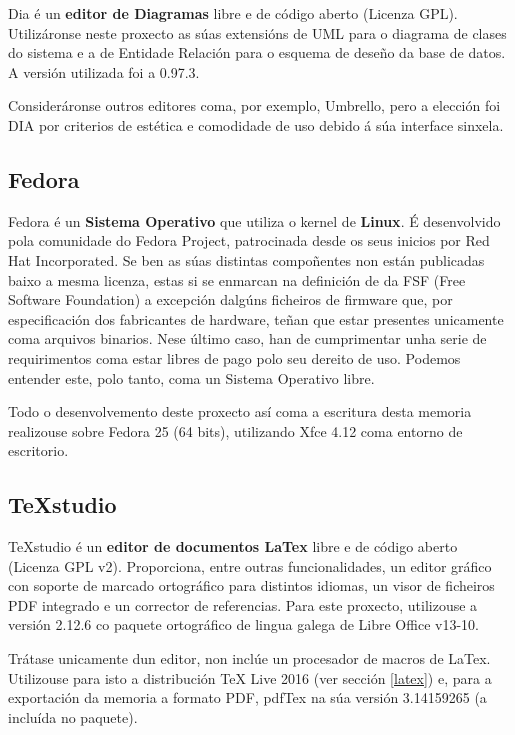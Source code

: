 Dia é un \textbf{editor de Diagramas} libre e de código aberto (Licenza GPL). Utilizáronse neste proxecto as súas extensións de UML para o diagrama de clases do sistema e a de Entidade Relación para o esquema de deseño da base de datos. A versión utilizada foi a 0.97.3.

Consideráronse outros editores coma, por exemplo, Umbrello, pero a elección foi DIA por criterios de estética e comodidade de uso debido á súa interface sinxela.

\subsection{Fedora}

Fedora é un \textbf{Sistema Operativo} que utiliza o kernel de \textbf{Linux}. É desenvolvido pola comunidade do Fedora Project, patrocinada desde os seus inicios por Red Hat Incorporated. Se ben as súas distintas compoñentes non están publicadas baixo a mesma licenza, estas si se enmarcan na definición de  da FSF (Free Software Foundation) a excepción dalgúns ficheiros de firmware que, por especificación dos fabricantes de hardware, teñan que estar presentes unicamente coma arquivos binarios. Nese último caso, han de cumprimentar unha serie de requirimentos coma estar libres de pago polo seu dereito de uso\cite{fedora}. Podemos entender este, polo tanto, coma un Sistema Operativo libre.

Todo o desenvolvemento deste proxecto así coma a escritura desta memoria realizouse sobre Fedora 25 (64 bits), utilizando Xfce 4.12 coma entorno de escritorio.


\subsection{TeXstudio}

TeXstudio é un \textbf{editor de documentos LaTex} libre e de código aberto (Licenza GPL v2\cite{texstudio}). Proporciona, entre outras funcionalidades, un editor gráfico con soporte de marcado ortográfico para distintos idiomas, un visor de ficheiros PDF integrado e un corrector de referencias. Para este proxecto, utilizouse a versión 2.12.6 co paquete ortográfico de lingua galega de Libre Office v13-10.

Trátase unicamente dun editor, non inclúe un procesador de macros de LaTex. Utilizouse para isto a distribución TeX Live 2016 (ver sección \ref{latex}) e, para a exportación da memoria a formato PDF, pdfTex na súa versión 3.14159265 (a incluída no paquete).


